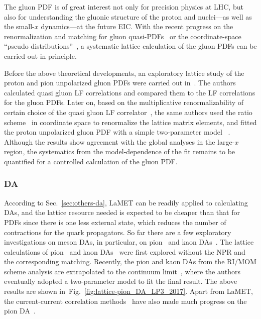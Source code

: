 \documentclass[aps,rmp,reprint,amsmath,amssymb,graphicx,longbibliography]{revtex4-1} %
\DeclareRobustCommand{\sec}[1]{Sec.~\ref{sec:#1}}
\DeclareRobustCommand{\fig}[1]{Fig.~\ref{fig:#1}}
\begin{document}
The gluon PDF is of great interest not only for precision physics at LHC, but also for understanding the gluonic structure of the proton and nuclei---as well as the small-$x$ dynamics---at the future EIC.
%
With the recent progress on the renormalization and matching for gluon quasi-PDFs~\cite{Wang:2017eel,Wang:2017qyg,Zhang:2018diq,Li:2018tpe,Wang:2019tgg} or the coordinate-space ``pseudo distributions''~\cite{Balitsky:2019krf}, a systematic lattice calculation of the gluon PDFs can be carried out in principle.

Before the above theoretical developments, an exploratory lattice study of the proton and pion unpolarized gluon PDFs were carried out in~\cite{Fan:2018dxu}. The authors calculated quasi gluon LF correlations and compared them to the LF correlations for the gluon PDFs. Later on, based on the multiplicative renormalizability of certain choice of the quasi gluon LF correlator~\cite{Zhang:2018diq}, the same authors used the ratio scheme~\cite{Balitsky:2019krf} in coordinate space to renormalize the lattice matrix elements, and fitted the proton unpolarized gluon PDF with a simple two-parameter model ~\cite{Fan:2020cpa}. Although the results show agreement with the global analyses in the large-$x$ region, the systematics from the model-dependence of the fit remains to be quantified for a controlled calculation of the gluon PDF.

\subsubsection{DA}
\label{sec:lattice-DA}

According to \sec{others-da}, LaMET can be readily applied to calculating DAs, and the lattice resource needed is expected to be cheaper than that for PDFs since there is one less external state, which reduces the number of contractions for the quark propagators.
%
So far there are a few exploratory investigations on meson DAs, in particular, on pion~\cite{Zhang:2017bzy} and kaon DAs~\cite{Chen:2017gck}.
%
The lattice calculations of pion~\cite{Zhang:2017bzy} and kaon DAs~\cite{Chen:2017gck} were first explored without the NPR and the corresponding matching. Recently, the pion and kaon DAs from the RI/MOM scheme analysis are extrapolated to the continuum limit~\cite{Zhang:2020gaj}, where the authors eventually adopted a two-parameter model to fit the final result.
%
The above results are shown in~\fig{lattice-pion_DA_LP3_2017}.
%
Apart from LaMET, the current-current correlation methods~\cite{Braun:2007wv,Braun:2015axa,Detmold:2005gg} have also made much progress on the pion DA~\cite{Bali:2019dqc,Detmold:2018kwu,Detmold:2020lev}.
%
\end{document}
